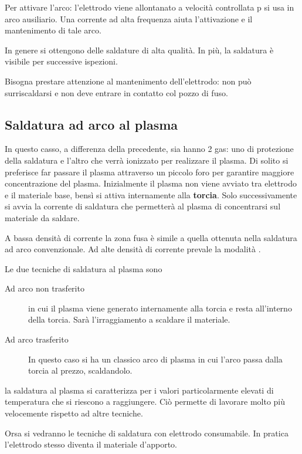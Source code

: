 Per attivare l'arco: l'elettrodo viene allontanato a velocità controllata p si usa in arco ausiliario.
Una corrente ad alta frequenza aiuta l'attivazione e il mantenimento di tale arco.

In genere si ottengono delle saldature di alta qualità.
In più, la saldatura è visibile per successive ispezioni.

Bisogna prestare attenzione al mantenimento dell'elettrodo: non può surriscaldarsi e non deve entrare in contatto col pozzo di fuso.

\subsection{Saldatura ad arco al plasma}
In questo casso, a differenza della precedente, sia hanno 2 gas: uno di protezione della saldatura e l'altro che verrà ionizzato per realizzare il plasma.
Di solito si preferisce far passare il plasma attraverso un piccolo foro per garantire maggiore concentrazione del plasma.
Inizialmente il plasma non viene avviato tra elettrodo e il materiale base, bensì si attiva internamente alla \textbf{torcia}. Solo successivamente si avvia la corrente di saldatura che permetterà al plasma di concentrarsi sul materiale da saldare.

A bassa densità di corrente la zona fusa è simile a quella ottenuta nella saldatura ad arco convenzionale.
Ad alte densità di corrente prevale la modalità .


Le due tecniche di saldatura al plasma sono
\begin{description}
\item[Ad arco non trasferito] in cui il plasma viene generato internamente alla torcia e resta all'interno della torcia. Sarà l'irraggiamento a scaldare il materiale.
\item[Ad arco trasferito] In questo caso si ha un classico arco di plasma in cui l'arco passa dalla torcia al prezzo, scaldandolo.
\end{description}


la saldatura al plasma si caratterizza per i valori particolarmente elevati di temperatura che si riescono a raggiungere. Ciò permette di lavorare molto più velocemente rispetto ad altre tecniche.

Orsa si vedranno le tecniche di saldatura con elettrodo consumabile.
In pratica l'elettrodo stesso diventa il materiale d'apporto.

